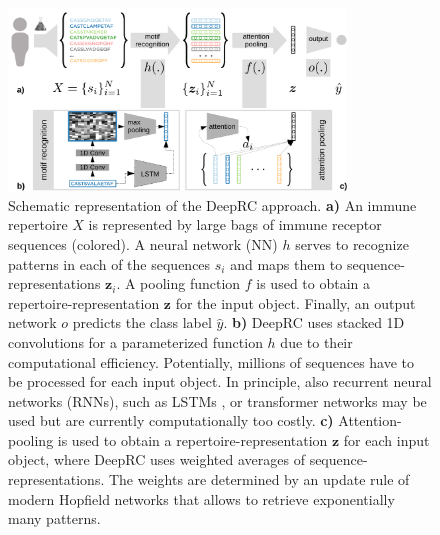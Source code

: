 \documentclass[oneside]{book}
\newcommand\Bz{\bm{z}}
\begin{document}
\begin{figure}[t]
    \centering
    \includegraphics[width=0.8\textwidth]{figures/Figure_Overview_DeepRC.pdf}
    \caption[]{Schematic representation of the DeepRC approach.
    \textbf{a)} An immune repertoire $X$ is represented by large bags of immune receptor sequences (colored). 
    A neural network (NN) $h$ serves to recognize patterns in
    each of the sequences $s_i$ and maps them to sequence-representations $\Bz_i$.
    A pooling function $f$ is used to obtain a repertoire-representation $\Bz$ for the input
    object.
    Finally, an output network $o$ predicts the class label $\hat y$. 
    \textbf{b)} DeepRC uses stacked 1D convolutions for a parameterized function $h$ due to their computational efficiency. Potentially, millions 
    of sequences have to be processed for each input object. In principle, also 
    recurrent neural networks (RNNs), such as LSTMs \citep{hochreiter2007fast}, or transformer 
    networks \citep{vaswani2017attention} may be used 
    but are currently computationally too costly. 
    \textbf{c)} Attention-pooling is used to obtain a repertoire-representation $\Bz$ for 
    each input object, where DeepRC uses weighted averages of sequence-representations. 
    The weights are determined by an update rule of modern Hopfield networks that 
    allows to retrieve exponentially many patterns.
    } 
    \vspace{-5mm}
    \label{fig:deeprc_approach}
\end{figure}
\end{document}
